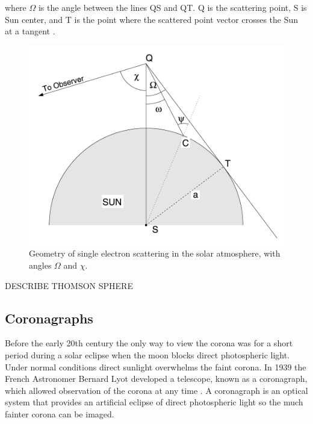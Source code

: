 where $\Omega$ is the angle between the lines QS and QT. Q is the scattering point, S is Sun center, and T is the point where the scattered point vector crosses the Sun at a tangent \citep{howtap2009}.

\begin{figure}[h!]
\begin{center}
\includegraphics[scale=0.3, angle=0]{images/Omega}
\caption[Coronal Thomson scattering geometry]{Geometry of single electron scattering in the solar atmosphere, with angles $\Omega$ and $\chi$.}
\end{center}
\end{figure}

DESCRIBE THOMSON SPHERE


\subsection{Coronagraphs}
Before the early 20th century the only way to view the corona was for a short period during a solar eclipse when the moon blocks direct photospheric light. Under normal conditions direct sunlight overwhelms the faint corona. In 1939 the French Astronomer Bernard Lyot developed a telescope, known as a coronagraph, which allowed observation of the corona at any time \citep{lyot1939}. A coronagraph is an optical system that provides an artificial eclipse of direct photospheric light so the much fainter corona can be imaged.

